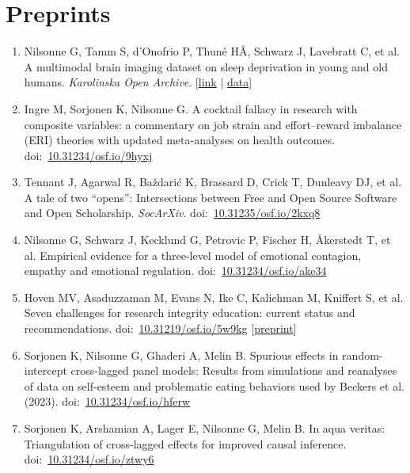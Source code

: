 \documentclass[10pt,a4paper,twocolumn]{article}
\begin{document}
\section{Preprints}
\begin{enumerate}

    \item Nilsonne G, Tamm S, d’Onofrio P, Thuné HÅ, Schwarz J, Lavebratt C, et al. A multimodal brain imaging dataset on sleep deprivation in young and old humans. \textit{Karolinska Open Archive}. [\href{http://hdl.handle.net/10616/45181}{link} | \href{https://openneuro.org/dataset/ds000201/}{data}]

    \item Ingre M, Sorjonen K, Nilsonne G. A cocktail fallacy in research with composite variables: a commentary on job strain and effort–reward imbalance (ERI) theories with updated meta-analyses on health outcomes. doi:~\href{https://doi.org/10.31234/osf.io/9hyxj}{10.31234/osf.io/9hyxj}

    \item Tennant J, Agarwal R, Baždarić K, Brassard D, Crick T, Dunleavy DJ, et al. A tale of two “opens”: Intersections between Free and Open Source Software and Open Scholarship. \textit{SocArXiv}. doi:~\href{https://doi.org/10.31235/osf.io/2kxq8}{10.31235/osf.io/2kxq8}

    \item Nilsonne G, Schwarz J, Kecklund G, Petrovic P, Fischer H, Åkerstedt T, et al. Empirical evidence for a three-level model of emotional contagion, empathy and emotional regulation. doi:~\href{https://doi.org/10.31234/osf.io/ake34}{10.31234/osf.io/ake34}

    \item Hoven MV, Asaduzzaman M, Evans N, Ike C, Kalichman M, Kniffert S, et al. Seven challenges for research integrity education: current status and recommendations. doi:~\href{https://doi.org/10.31219/osf.io/5w9kg}{10.31219/osf.io/5w9kg} [\href{https://doi.org/10.31219/osf.io/5w9kg}{preprint}]

    \item Sorjonen K, Nilsonne G, Ghaderi A, Melin B. Spurious effects in random-intercept cross-lagged panel models: Results from simulations and reanalyses of data on self-esteem and problematic eating behaviors used by Beckers et al. (2023). doi:~\href{https://doi.org/10.31234/osf.io/hferw}{10.31234/osf.io/hferw}

    \item Sorjonen K, Arshamian A, Lager E, Nilsonne G, Melin B. In aqua veritas: Triangulation of cross-lagged effects for improved causal inference. doi:~\href{https://doi.org/10.31234/osf.io/ztwy6}{10.31234/osf.io/ztwy6}


\end{enumerate}
\end{document}
